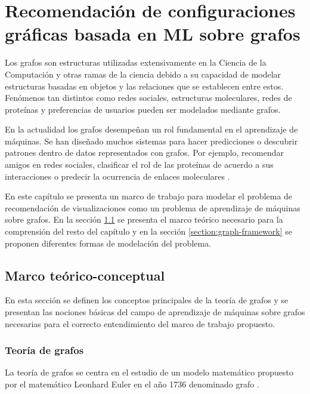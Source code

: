 \chapter{Recomendaci\'on de configuraciones gr\'aficas basada en ML sobre grafos}\label{chapter:ml-on-graphs}

Los grafos son estructuras utilizadas extensivamente en la Ciencia de la Computaci\'on y otras
ramas de la ciencia debido a su capacidad de modelar estructuras basadas
en objetos y las relaciones que se establecen entre estos. Fen\'omenos
tan distintos como redes sociales, estructuras moleculares, redes de prote\'inas y
preferencias de usuarios pueden ser modelados mediante grafos.

En la actualidad los grafos desempe\~nan un rol fundamental en el
aprendizaje de m\'aquinas. Se han dise\~nado muchos sistemas para hacer predicciones o descubrir patrones dentro
de datos representados con grafos. Por ejemplo, recomendar amigos en
redes sociales, clasificar el rol de las prote\'inas de acuerdo a sus interacciones
o predecir la ocurrencia de enlaces moleculares \cite{hamilton2017representation}.

En este cap\'itulo se presenta un marco de trabajo para modelar
el problema de recomendaci\'on de visualizaciones como un problema
de aprendizaje de m\'aquinas sobre grafos. En la secci\'on \ref{section:theoretical-framework}
se presenta el marco te\'orico necesario para la comprensi\'on del
resto del cap\'itulo y en la secci\'on \ref{section:graph-framework} se proponen
diferentes formas de modelaci\'on del problema. 


\section{Marco te\'orico-conceptual}\label{section:theoretical-framework}

En esta secci\'on se definen los conceptos principales de la teor\'ia de grafos
y se presentan las nociones b\'asicas del campo de aprendizaje de m\'aquinas
sobre grafos necesarias para el correcto entendimiento del marco de trabajo propuesto.

\subsection{Teor\'ia de grafos}

La teor\'ia de grafos se centra en el estudio de un modelo
matem\'atico propuesto por el matem\'atico Leonhard Euler en el
a\~no 1736 denominado grafo \cite{estrada2012structure}.


